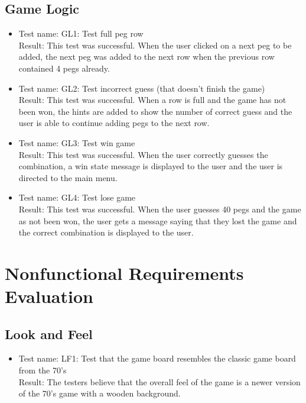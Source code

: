 \documentclass[12pt, titlepage]{article}
\begin{document}
\subsection{Game Logic}
\begin{itemize}
    \item Test name: GL1: Test full peg row \\
        Result: This test was successful. When the user clicked on a next peg to be added, the next peg was added to the next row when the previous row contained 4 pegs already.
    \item Test name: GL2: Test incorrect guess (that doesn't finish the game) \\
        Result: This test was successful. When a row is full and the game has not been won, the hints are added to show the number of correct guess and the user is able to continue adding pegs to the next row.
    \item Test name: GL3: Test win game \\
        Result: This test was successful. When the user correctly guesses the combination, a win state message is displayed to the user and the user is directed to the main menu.
    \item Test name: GL4: Test lose game \\
        Result: This test was successful. When the user guesses 40 pegs and the game as not been won, the user gets a message saying that they lost the game and the correct combination is displayed to the user.
\end{itemize}

\section{Nonfunctional Requirements Evaluation}
\subsection{Look and Feel}
\begin{itemize}
        \item Test name: LF1: Test that the game board resembles the classic game board from the 70's \\
        Result: The testers believe that the overall feel of the game is a newer version of the 70's game with a wooden background.
\end{itemize}
\end{document}
